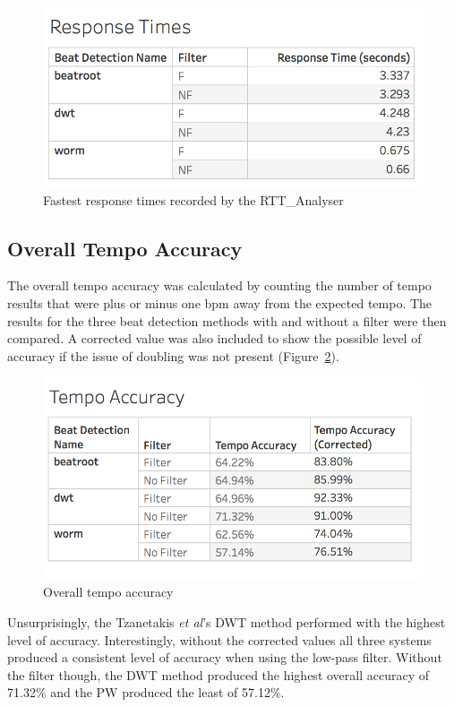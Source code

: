 \documentclass[a4paper, 11pt]{article}
\begin{document}
\begin{figure}
\centering
\includegraphics[scale=0.3]{images/ResponseTime.jpg}
\caption{Fastest response times recorded by the RTT\_Analyser}
\label{fig: resTime}
\end{figure}

\subsection{Overall Tempo Accuracy}
The overall tempo accuracy was calculated by counting the number of tempo results that were plus or minus one bpm away from the expected tempo. The results for the three beat detection methods with and without a filter were then compared. A corrected value was also included to show the possible level of accuracy if the issue of doubling was not present (Figure~\ref{fig: OTA}).

\begin{figure}[htbp]
\centering
\includegraphics[scale=0.35]{images/TempoAcc.jpg}
\caption{Overall tempo accuracy}
\label{fig: OTA}
\end{figure}

Unsurprisingly, the Tzanetakis \textit{et al}'s \cite{tzane1} DWT method performed with the highest level of accuracy. Interestingly, without the corrected values all three systems produced a consistent level of accuracy when using the low-pass filter. Without the filter though, the DWT method produced the highest overall accuracy of 71.32\% and the PW produced the least of 57.12\%.\par
\end{document}
